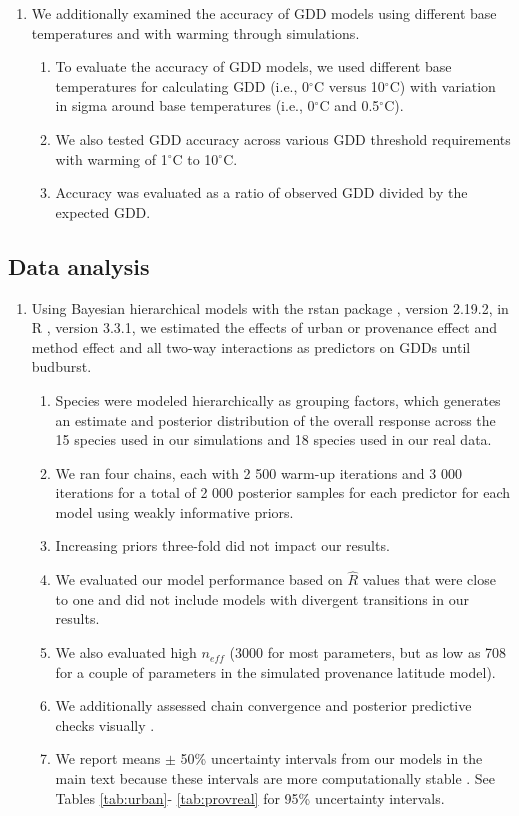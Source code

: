 \documentclass{article}\usepackage[]{graphicx}\usepackage[]{color}
\begin{document}
\begin{enumerate}
\item We additionally examined the accuracy of GDD models using different base temperatures and with warming through simulations.
\begin{enumerate}
  \item To evaluate the accuracy of GDD models, we used different base temperatures for calculating GDD (i.e., 0$^{\circ}$C versus 10$^{\circ}$C) with variation in sigma around base temperatures (i.e., 0$^{\circ}$C and 0.5$^{\circ}$C).
  \item We also tested GDD accuracy across various GDD threshold requirements with warming of 1$^{\circ}$C to 10$^{\circ}$C. 
  \item Accuracy was evaluated as a ratio of observed GDD divided by the expected GDD.
\end{enumerate}
\end{enumerate}

\subsection*{Data analysis}
\begin{enumerate}
\item Using Bayesian hierarchical models with the rstan package \citep{rstan2019}, version 2.19.2,  in R \citep{R}, version 3.3.1, we estimated the effects of urban or provenance effect and method effect and all two-way interactions as predictors on GDDs until budburst. 
  \begin{enumerate} 
  \item Species were modeled hierarchically as grouping factors, which generates an estimate and posterior distribution of the overall response across the 15 species used in our simulations and 18 species used in our real data.
  \item We ran four chains, each with 2 500 warm-up iterations and 3 000 iterations for a total of 2 000 posterior samples for each predictor for each model using weakly informative priors.
  \item Increasing priors three-fold did not impact our results.
  \item We evaluated our model performance based on $\hat{R}$ values that were close to one and did not include models with divergent transitions in our results. 
  \item We also evaluated high $n_{eff}$ (3000 for most parameters, but as low as 708 for a couple of parameters in the simulated provenance latitude model). 
  \item We additionally assessed chain convergence and posterior predictive checks visually \citep{BDA}.
  \item We report means $\pm$ 50\% uncertainty intervals from our models in the main text because these intervals are more computationally stable \citep{Carpenter2017,BDA}. See Tables \ref{tab:urban}- \ref{tab:provreal} for 95\% uncertainty intervals. 
  \end{enumerate}
\end{enumerate}
\end{document}
